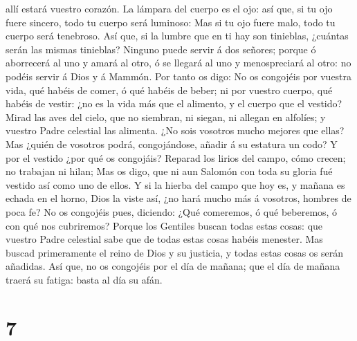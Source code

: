 allí estará vuestro corazón.  La lámpara del cuerpo es el
ojo: así que, si tu ojo fuere sincero, todo tu cuerpo será luminoso:
 Mas si tu ojo fuere malo, todo tu cuerpo será tenebroso.
Así que, si la lumbre que en ti hay son tinieblas, ¿cuántas serán las
mismas tinieblas?  Ninguno puede servir á dos señores;
porque ó aborrecerá al uno y amará al otro, ó se llegará al uno y
menospreciará al otro: no podéis servir á Dios y á Mammón. 
Por tanto os digo: No os congojéis por vuestra vida, qué habéis de
comer, ó qué habéis de beber; ni por vuestro cuerpo, qué habéis de
vestir: ¿no es la vida más que el alimento, y el cuerpo que el vestido?
 Mirad las aves del cielo, que no siembran, ni siegan, ni
allegan en alfolíes; y vuestro Padre celestial las alimenta. ¿No sois
vosotros mucho mejores que ellas?  Mas ¿quién de vosotros
podrá, congojándose, añadir á su estatura un codo?  Y por
el vestido ¿por qué os congojáis? Reparad los lirios del campo, cómo
crecen; no trabajan ni hilan;  Mas os digo, que ni aun
Salomón con toda su gloria fué vestido así como uno de ellos.
 Y si la hierba del campo que hoy es, y mañana es echada en
el horno, Dios la viste así, ¿no hará mucho más á vosotros, hombres de
poca fe?  No os congojéis pues, diciendo: ¿Qué comeremos, ó
qué beberemos, ó con qué nos cubriremos?  Porque los
Gentiles buscan todas estas cosas: que vuestro Padre celestial sabe que
de todas estas cosas habéis menester.  Mas buscad
primeramente el reino de Dios y su justicia, y todas estas cosas os
serán añadidas.  Así que, no os congojéis por el día de
mañana; que el día de mañana traerá su fatiga: basta al día su afán.

\hypertarget{section-6}{%
\section{7}\label{section-6}}

